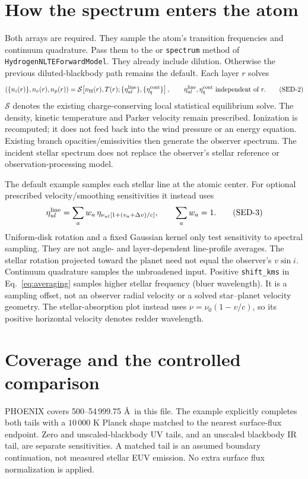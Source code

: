 \documentclass[10pt,a4paper]{article}
\begin{document}
\section{How the spectrum enters the atom}
Both arrays are required. They sample the atom's transition frequencies and
continuum quadrature. Pass them to the  or
\texttt{spectrum} method of \texttt{HydrogenNLTEForwardModel}.
They already include dilution. Otherwise the previous
diluted-blackbody path remains the default. Each layer $r$ solves
\begin{equation}
 (\{n_i(r)\},n_e(r),n_p(r))
 =\mathcal S\!\left[n_{\rm H}(r),T(r);
       \{\eta^{\rm line}_{ul}\},\{\eta^{\rm cont}_q\}\right],
 \qquad \eta^{\rm line}_{ul},\eta^{\rm cont}_q\ \hbox{independent of }r.
 \tag{SED-2}\label{eq:shared}
\end{equation}
$\mathcal S$ denotes the existing charge-conserving local statistical
equilibrium solve. The density, kinetic temperature and Parker velocity
remain prescribed. Ionization is recomputed; it does not feed back into the
wind pressure or an energy equation. Existing branch opacities/emissivities
then generate the observer spectrum. The incident stellar spectrum does not
replace the observer's stellar reference or observation-processing model.

The default example samples each stellar line at the atomic center.
For optional prescribed velocity/smoothing sensitivities it instead uses
\begin{equation}
 \eta^{\rm line}_{ul}=\sum_a w_a\,
 \eta_{\nu_{ul}[1+(v_a+\Delta v)/c]},\qquad \sum_a w_a=1.
 \tag{SED-3}\label{eq:averaging}
\end{equation}
Uniform-disk rotation and a fixed Gaussian kernel only test sensitivity to
spectral sampling. They are not angle- and layer-dependent line-profile
averages. The stellar rotation projected toward the planet need not equal
the observer's $v\sin i$. Continuum quadrature samples the unbroadened input.
Positive \texttt{shift\_kms} in Eq.~\eqref{eq:averaging} samples higher
stellar frequency (bluer wavelength). It is a sampling offset, not an
observer radial velocity or a solved star--planet velocity geometry.
The stellar-absorption plot instead uses $\nu=\nu_0(1-v/c)$, so its positive
horizontal velocity denotes redder wavelength.

\newpage
\section{Coverage and the controlled comparison}
PHOENIX covers 500--54\,999.75 \AA\ in this file. The example explicitly
completes both tails with a $10\,000$ K Planck shape matched to the nearest
surface-flux endpoint. Zero and unscaled-blackbody UV tails, and an unscaled
blackbody IR tail, are separate sensitivities. A matched tail is an assumed
boundary continuation, not measured stellar EUV emission. No extra surface
flux normalization is applied.
\end{document}
